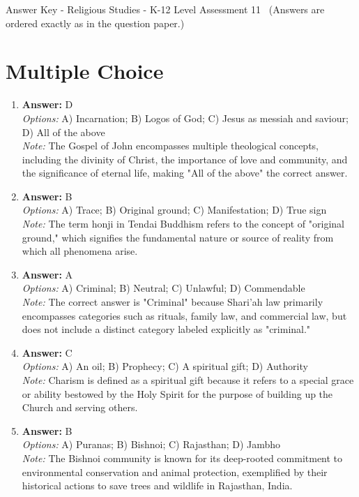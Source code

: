 \documentclass[12pt]{article}
\begin{document}
\begin{center}
Answer Key - Religious Studies - K-12 Level Assessment 11 \
\small (Answers are ordered exactly as in the question paper.)
\end{center}

\section*{Multiple Choice}
\begin{enumerate}[label=\arabic*.]
\item \textbf{Answer:} D
\\ \textit{Options:} A) Incarnation; B) Logos of God; C) Jesus as messiah and saviour; D) All of the above
\\ \textit{Note:} The Gospel of John encompasses multiple theological concepts, including the divinity of Christ, the importance of love and community, and the significance of eternal life, making "All of the above" the correct answer.
\item \textbf{Answer:} B
\\ \textit{Options:} A) Trace; B) Original ground; C) Manifestation; D) True sign
\\ \textit{Note:} The term honji in Tendai Buddhism refers to the concept of "original ground," which signifies the fundamental nature or source of reality from which all phenomena arise.
\item \textbf{Answer:} A
\\ \textit{Options:} A) Criminal; B) Neutral; C) Unlawful; D) Commendable
\\ \textit{Note:} The correct answer is "Criminal" because Shari'ah law primarily encompasses categories such as rituals, family law, and commercial law, but does not include a distinct category labeled explicitly as "criminal."
\item \textbf{Answer:} C
\\ \textit{Options:} A) An oil; B) Prophecy; C) A spiritual gift; D) Authority
\\ \textit{Note:} Charism is defined as a spiritual gift because it refers to a special grace or ability bestowed by the Holy Spirit for the purpose of building up the Church and serving others.
\item \textbf{Answer:} B
\\ \textit{Options:} A) Puranas; B) Bishnoi; C) Rajasthan; D) Jambho
\\ \textit{Note:} The Bishnoi community is known for its deep-rooted commitment to environmental conservation and animal protection, exemplified by their historical actions to save trees and wildlife in Rajasthan, India.
\end{enumerate}
\end{document}
